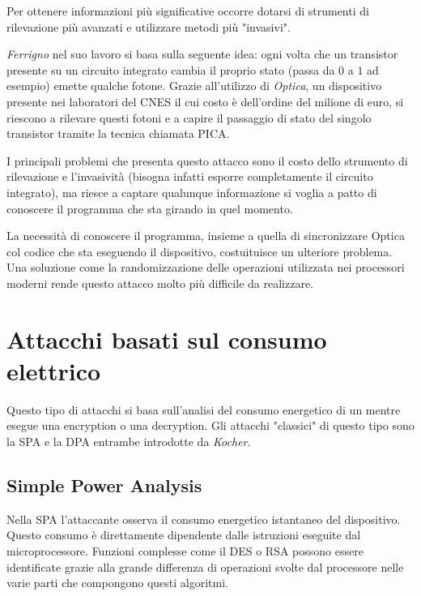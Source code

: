 		Per ottenere informazioni più significative occorre dotarsi di strumenti di rilevazione più avanzati e utilizzare metodi più "invasivi".
		
		\emph{Ferrigno} nel suo lavoro\cite{ferrigno2008aes} si basa sulla seguente idea: ogni volta che un transistor presente su un circuito integrato cambia il proprio stato (passa da $0$ a $1$ ad esempio) emette qualche fotone. Grazie all'utilizzo di \emph{Optica}, un dispositivo presente nei laboratori del \ac{CNES} il cui costo è dell'ordine del milione di euro, si riescono a rilevare questi fotoni e a capire il passaggio di stato del singolo transistor tramite la tecnica chiamata \ac{PICA}\cite{tsang2000picosecond}.
		
		I principali problemi che presenta questo attacco sono il costo dello strumento di rilevazione e l'invasività (bisogna infatti esporre completamente il circuito integrato), ma riesce a captare qualunque informazione si voglia a patto di conoscere il programma che sta girando in quel momento.
				
		La necessità di conoscere il programma, insieme a quella di sincronizzare Optica col codice che sta eseguendo il dispositivo, costuituisce un ulteriore problema. Una soluzione come la randomizzazione delle operazioni utilizzata nei processori moderni rende questo attacco molto più difficile da realizzare.
			
	\section{Attacchi basati sul consumo elettrico}
		Questo tipo di attacchi si basa sull'analisi del consumo energetico di un \disps mentre esegue una encryption o una decryption. Gli attacchi "classici" di questo tipo sono la \ac{SPA} e la \ac{DPA} entrambe introdotte da \emph{Kocher}\cite{kocher2011introduction}.
		
		\subsection{Simple Power Analysis}
		Nella \ac{SPA} l'attaccante osserva il consumo energetico istantaneo del dispositivo. Questo consumo è direttamente dipendente dalle istruzioni eseguite dal microprocessore. Funzioni complesse come il \ac{DES} o RSA possono essere identificate grazie alla grande differenza di operazioni svolte dal processore nelle varie parti che compongono questi algoritmi. 
		
